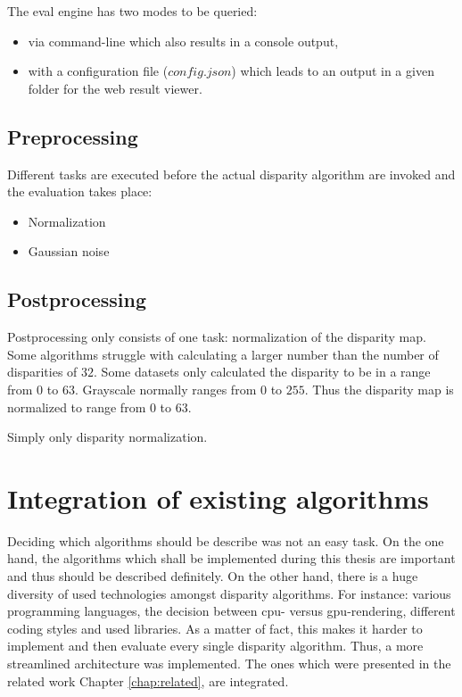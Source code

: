 The eval engine has two modes to be queried:

\begin{itemize}
  \item via command-line which also results in a console output,
  \item with a configuration file ($config.json$) which leads to an output in a given folder for the web result viewer.
\end{itemize}

\subsection*{Preprocessing}

Different tasks are executed before the actual disparity algorithm are invoked and the evaluation takes place:

\begin{itemize}
  \item Normalization
  \item Gaussian noise
\end{itemize}

\subsection*{Postprocessing}

Postprocessing only consists of one task: normalization of the disparity map.
Some algorithms struggle with calculating a larger number than the number of disparities of $32$.
Some datasets only calculated the disparity to be in a range from $0$ to $63$.
Grayscale normally ranges from $0$ to $255$.
Thus the disparity map is normalized to range from $0$ to $63$.

Simply only disparity normalization.

\section{Integration of existing algorithms}

Deciding which algorithms should be describe was not an easy task.
On the one hand, the algorithms which shall be implemented during this thesis are important and thus should be described definitely.
On the other hand, there is a huge diversity of used technologies amongst disparity algorithms.
For instance: various programming languages, the decision between cpu- versus gpu-rendering, different coding styles and used libraries.
As a matter of fact, this makes it harder to implement and then evaluate every single disparity algorithm.
Thus, a more streamlined architecture was implemented.
The ones which were presented in the related work Chapter \ref{chap:related}, are integrated.

